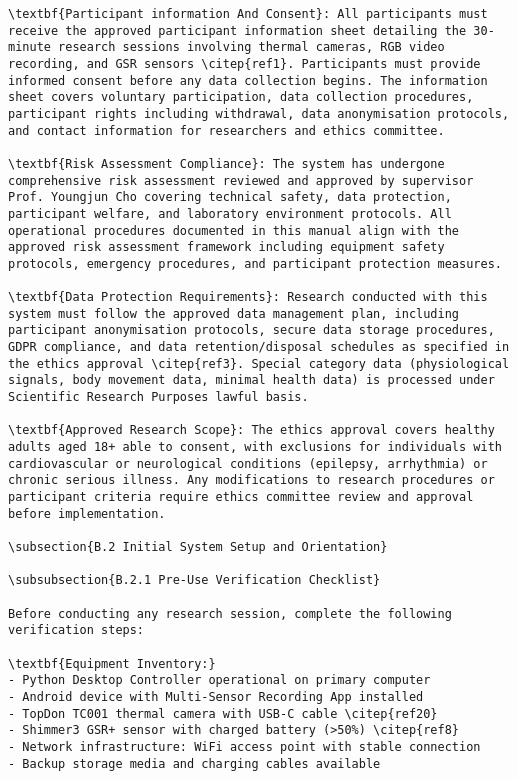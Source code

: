 \begin{verbatim}
\textbf{Participant information And Consent}: All participants must receive the approved participant information sheet detailing the 30-minute research sessions involving thermal cameras, RGB video recording, and GSR sensors \citep{ref1}. Participants must provide informed consent before any data collection begins. The information sheet covers voluntary participation, data collection procedures, participant rights including withdrawal, data anonymisation protocols, and contact information for researchers and ethics committee.

\textbf{Risk Assessment Compliance}: The system has undergone comprehensive risk assessment reviewed and approved by supervisor Prof. Youngjun Cho covering technical safety, data protection, participant welfare, and laboratory environment protocols. All operational procedures documented in this manual align with the approved risk assessment framework including equipment safety protocols, emergency procedures, and participant protection measures.

\textbf{Data Protection Requirements}: Research conducted with this system must follow the approved data management plan, including participant anonymisation protocols, secure data storage procedures, GDPR compliance, and data retention/disposal schedules as specified in the ethics approval \citep{ref3}. Special category data (physiological signals, body movement data, minimal health data) is processed under Scientific Research Purposes lawful basis.

\textbf{Approved Research Scope}: The ethics approval covers healthy adults aged 18+ able to consent, with exclusions for individuals with cardiovascular or neurological conditions (epilepsy, arrhythmia) or chronic serious illness. Any modifications to research procedures or participant criteria require ethics committee review and approval before implementation.

\subsection{B.2 Initial System Setup and Orientation}

\subsubsection{B.2.1 Pre-Use Verification Checklist}

Before conducting any research session, complete the following verification steps:

\textbf{Equipment Inventory:}
- Python Desktop Controller operational on primary computer
- Android device with Multi-Sensor Recording App installed
- TopDon TC001 thermal camera with USB-C cable \citep{ref20}
- Shimmer3 GSR+ sensor with charged battery (>50%) \citep{ref8}
- Network infrastructure: WiFi access point with stable connection
- Backup storage media and charging cables available


\end{verbatim}
